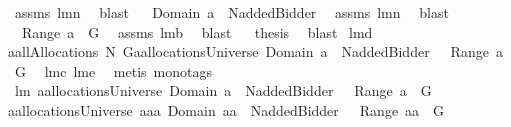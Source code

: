 \begin{isabellebody}
\ assms\ lm{}{}n\ \isamarkupfalse%
\ blast\isanewline
{}\isamarkupfalse%
\ \isamarkupfalse%
\ {\isachardoublequoteopen}Domain\ a\ {\isasymsubseteq}\ N{\isacharminus}{\isacharbraceleft}addedBidder{\isacharprime}{\isacharbraceright}{\isachardoublequoteclose}\ \isamarkupfalse%
\ assms\ lm{}{}n\ \isamarkupfalse%
\ blast\isanewline
{}\isamarkupfalse%
\ \isamarkupfalse%
\ {\isachardoublequoteopen}{\isasymUnion}\ Range\ a\ {\isasymsubseteq}\ G{\isachardoublequoteclose}\ \isamarkupfalse%
\ assms\ lm{}{}b\ \isamarkupfalse%
\ blast\isanewline
{}\isamarkupfalse%
\ \isamarkupfalse%
\ {\isacharquery}thesis\ \isamarkupfalse%
\ blast\isanewline
{}\isamarkupfalse%
%
\endisatagproof
{\isafoldproof}%
%
\isadelimproof
\isanewline
%
\endisadelimproof
\isanewline
{}\isamarkupfalse%
\ lm{}{}d{\isacharcolon}\ \isanewline
{\isachardoublequoteopen}{\isacharparenleft}a{\isasymin}allAllocations{\isacharprime}{\isacharprime}{\isacharprime}\ N\ G{\isacharparenright}{\isacharequal}{\isacharparenleft}a{\isasymin}allocationsUniverse{\isacharampersand}\ Domain\ a\ {\isasymsubseteq}\ N{\isacharminus}{\isacharbraceleft}addedBidder{\isacharprime}{\isacharbraceright}\ {\isacharampersand}\ {\isasymUnion}\ Range\ a\ {\isasymsubseteq}\ G{\isacharparenright}{\isachardoublequoteclose}\ \isanewline
%
\isadelimproof
%
\endisadelimproof
%
\isatagproof
{}\isamarkupfalse%
\ lm{}{}c\ lm{}{}e\ \isamarkupfalse%
\ {\isacharparenleft}metis\ {\isacharparenleft}mono{\isacharunderscore}tags{\isacharparenright}{\isacharparenright}%
\endisatagproof
{\isafoldproof}%
%
\isadelimproof
\isanewline
%
\endisadelimproof
\isanewline
{}\isamarkupfalse%
\ lm{}{}{\isacharcolon}\ {\isachardoublequoteopen}{\isacharparenleft}a{\isasymin}allocationsUniverse{\isacharampersand}\ Domain\ a\ {\isasymsubseteq}\ N{\isacharminus}{\isacharbraceleft}addedBidder{\isacharprime}{\isacharbraceright}\ {\isacharampersand}\ {\isasymUnion}\ Range\ a\ {\isasymsubseteq}\ G{\isacharparenright}\ {\isacharequal}\ \isanewline
{\isacharparenleft}a{\isasymin}allocationsUniverse{\isacharampersand}\ a{\isasymin}{\isacharbraceleft}aa{\isachardot}\ Domain\ aa\ {\isasymsubseteq}\ N{\isacharminus}{\isacharbraceleft}addedBidder{\isacharprime}{\isacharbraceright}\ {\isacharampersand}\ {\isasymUnion}\ Range\ aa\ {\isasymsubseteq}\ G{\isacharbraceright}{\isacharparenright}{\isachardoublequoteclose}\ \isanewline

\end{isabellebody}
